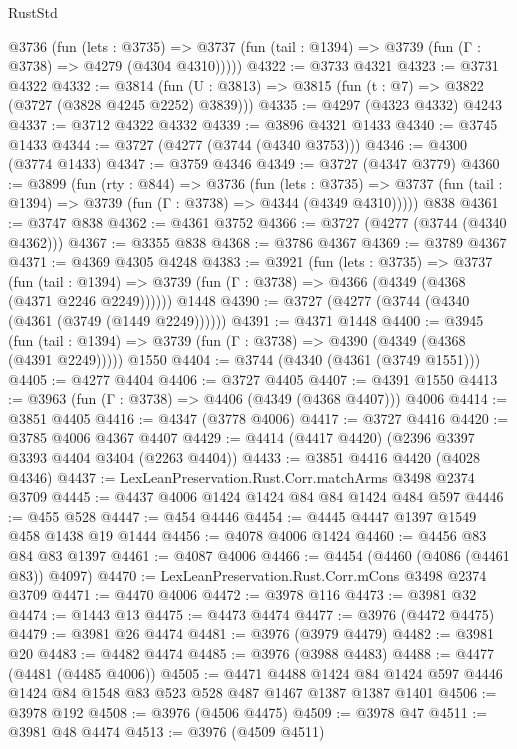 \begin{lexlean}{RustStd}
\begin{coremodule}
    @3736
      (fun (lets : @3735) =>
      @3737 (fun (tail : @1394) => @3739 (fun (Γ : @3738) => @4279 (@4304 @4310)))))
@4322 := @3733 @4321
@4323 := @3731 @4322
@4332 := @3814 (fun (U : @3813) => @3815 (fun (t : @7) => @3822 (@3727 (@3828 @4245 @2252) @3839)))
@4335 := @4297 (@4323 @4332) @4243
@4337 := @3712 @4322 @4332
@4339 := @3896 @4321 @1433
@4340 := @3745 @1433
@4344 := @3727 (@4277 (@3744 (@4340 @3753)))
@4346 := @4300 (@3774 @1433)
@4347 := @3759 @4346
@4349 := @3727 (@4347 @3779)
@4360 := @3899
    (fun (rty : @844) =>
    @3736
      (fun (lets : @3735) =>
      @3737 (fun (tail : @1394) => @3739 (fun (Γ : @3738) => @4344 (@4349 @4310)))))
    @838
@4361 := @3747 @838
@4362 := @4361 @3752
@4366 := @3727 (@4277 (@3744 (@4340 @4362)))
@4367 := @3355 @838
@4368 := @3786 @4367
@4369 := @3789 @4367
@4371 := @4369 @4305 @4248
@4383 := @3921
    (fun (lets : @3735) =>
    @3737
      (fun (tail : @1394) => @3739 (fun (Γ : @3738) => @4366 (@4349 (@4368 (@4371 @2246 @2249))))))
    @1448
@4390 := @3727 (@4277 (@3744 (@4340 (@4361 (@3749 (@1449 @2249))))))
@4391 := @4371 @1448
@4400 := @3945
    (fun (tail : @1394) => @3739 (fun (Γ : @3738) => @4390 (@4349 (@4368 (@4391 @2249)))))
    @1550
@4404 := @3744 (@4340 (@4361 (@3749 @1551)))
@4405 := @4277 @4404
@4406 := @3727 @4405
@4407 := @4391 @1550
@4413 := @3963 (fun (Γ : @3738) => @4406 (@4349 (@4368 @4407))) @4006
@4414 := @3851 @4405
@4416 := @4347 (@3778 @4006)
@4417 := @3727 @4416
@4420 := @3785 @4006 @4367 @4407
@4429 := @4414 (@4417 @4420) (@2396 @3397 @3393 @4404 @3404 (@2263 @4404))
@4433 := @3851 @4416 @4420 (@4028 @4346)
@4437 := LexLeanPreservation.Rust.Corr.matchArms @3498 @2374 @3709
@4445 := @4437 @4006 @1424 @1424 @84 @84 @1424 @484 @597
@4446 := @455 @528
@4447 := @454 @4446
@4454 := @4445 @4447 @1397 @1549 @458 @1438 @19 @1444
@4456 := @4078 @4006 @1424
@4460 := @4456 @83 @84 @83 @1397
@4461 := @4087 @4006
@4466 := @4454 (@4460 (@4086 (@4461 @83)) @4097)
@4470 := LexLeanPreservation.Rust.Corr.mCons @3498 @2374 @3709
@4471 := @4470 @4006
@4472 := @3978 @116
@4473 := @3981 @32
@4474 := @1443 @13
@4475 := @4473 @4474
@4477 := @3976 (@4472 @4475)
@4479 := @3981 @26 @4474
@4481 := @3976 (@3979 @4479)
@4482 := @3981 @20
@4483 := @4482 @4474
@4485 := @3976 (@3988 @4483)
@4488 := @4477 (@4481 (@4485 @4006))
@4505 := @4471
    @4488
    @1424
    @84
    @1424
    @597
    @4446
    @1424
    @84
    @1548
    @83
    @523
    @528
    @487
    @1467
    @1387
    @1387
    @1401
@4506 := @3978 @192
@4508 := @3976 (@4506 @4475)
@4509 := @3978 @47
@4511 := @3981 @48 @4474
@4513 := @3976 (@4509 @4511)

\end{coremodule}
\end{lexlean}

